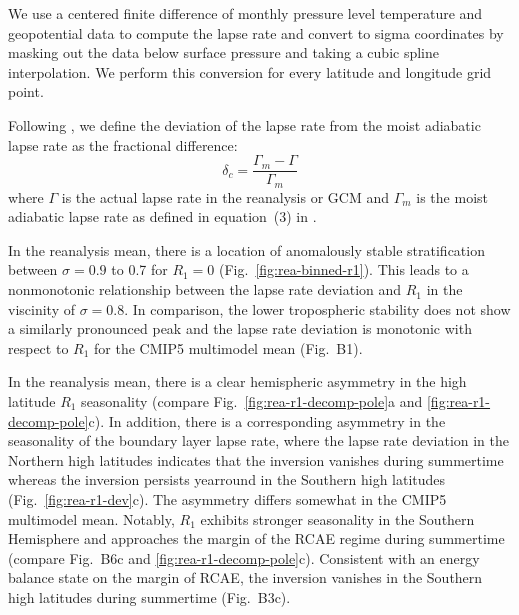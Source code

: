 \documentclass{ametsocV5}
\begin{document}

%
%

\appendix[A]
We use a centered finite difference of monthly pressure level temperature and geopotential data to compute the lapse rate and convert to sigma coordinates by masking out the data below surface pressure and taking a cubic spline interpolation. We perform this conversion for every latitude and longitude grid point. 

Following \cite{stone1979}, we define the deviation of the lapse rate from the moist adiabatic lapse rate as the fractional difference:
  \begin{equation}
    \delta_{c} = \frac{\Gamma_{m}-\Gamma}{\Gamma_{m}}
  \end{equation}
where $\Gamma$ is the actual lapse rate in the reanalysis or GCM and $\Gamma_m$ is the moist adiabatic lapse rate as defined in equation~(3) in \cite{stone1979}.

\appendix[B]
In the reanalysis mean, there is a location of anomalously stable stratification between $\sigma=0.9$ to 0.7 for $R_1=0$ (Fig.~\ref{fig:rea-binned-r1}). This leads to a nonmonotonic relationship between the lapse rate deviation and $R_1$ in the viscinity of $\sigma=0.8$. In comparison, the lower tropospheric stability does not show a similarly pronounced peak and the lapse rate deviation is monotonic with respect to $R_1$ for the CMIP5 multimodel mean (Fig.~B1).

In the reanalysis mean, there is a clear hemispheric asymmetry in the high latitude $R_1$ seasonality (compare Fig.~\ref{fig:rea-r1-decomp-pole}a and \ref{fig:rea-r1-decomp-pole}c). In addition, there is a corresponding asymmetry in the seasonality of the boundary layer lapse rate, where the lapse rate deviation in the Northern high latitudes indicates that the inversion vanishes during summertime whereas the inversion persists yearround in the Southern high latitudes (Fig.~\ref{fig:rea-r1-dev}c). The asymmetry differs somewhat in the CMIP5 multimodel mean. Notably, $R_1$ exhibits stronger seasonality in the Southern Hemisphere and approaches the margin of the RCAE regime during summertime (compare Fig.~B6c and \ref{fig:rea-r1-decomp-pole}c). Consistent with an energy balance state on the margin of RCAE, the inversion vanishes in the Southern high latitudes during summertime (Fig.~B3c).
\end{document}
